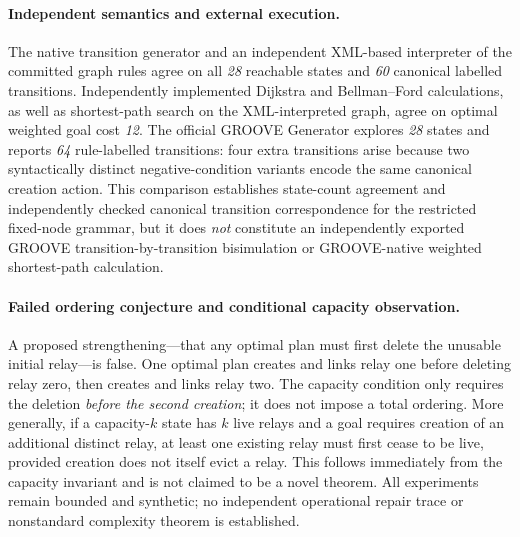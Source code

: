 \documentclass[11pt,a4paper]{article}
\begin{document}
\paragraph{Independent semantics and external execution.}
The native transition generator and an independent XML-based interpreter of the committed graph rules agree on all \emph{28} reachable states and \emph{60} canonical labelled transitions. Independently implemented Dijkstra and Bellman--Ford calculations, as well as shortest-path search on the XML-interpreted graph, agree on optimal weighted goal cost \emph{12}. The official GROOVE Generator explores \emph{28} states and reports \emph{64} rule-labelled transitions: four extra transitions arise because two syntactically distinct negative-condition variants encode the same canonical creation action. This comparison establishes state-count agreement and independently checked canonical transition correspondence for the restricted fixed-node grammar, but it does \emph{not} constitute an independently exported GROOVE transition-by-transition bisimulation or GROOVE-native weighted shortest-path calculation.

\paragraph{Failed ordering conjecture and conditional capacity observation.}
A proposed strengthening---that any optimal plan must first delete the unusable initial relay---is false. One optimal plan creates and links relay one before deleting relay zero, then creates and links relay two. The capacity condition only requires the deletion \emph{before the second creation}; it does not impose a total ordering. More generally, if a capacity-$k$ state has $k$ live relays and a goal requires creation of an additional distinct relay, at least one existing relay must first cease to be live, provided creation does not itself evict a relay. This follows immediately from the capacity invariant and is not claimed to be a novel theorem. All experiments remain bounded and synthetic; no independent operational repair trace or nonstandard complexity theorem is established.
\end{document}
